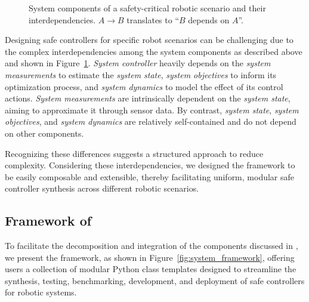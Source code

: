 \begin{figure}[htbp]
    \centering
    \vspace{2cm}  %
    \vspace{2cm}
    \caption{System components of a safety-critical robotic scenario and their interdependencies. $A\rightarrow B$ translates to ``$B$ depends on $A$''.}
    \label{fig: system_components}
\end{figure}

Designing safe controllers for specific robot scenarios can be challenging due to the complex interdependencies among the system components as described above and shown in Figure~\ref{fig: system_components}. 
\textit{System controller} heavily depends on the \textit{system measurements} to estimate the \textit{system state}, \textit{system objectives} to inform its optimization process, and \textit{system dynamics} to model the effect of its control actions.
\textit{System measurements} are intrinsically dependent on the \textit{system state}, aiming to approximate it through sensor data.
By contrast, \textit{system state}, \textit{system objectives}, and \textit{system dynamics} are relatively self-contained and do not depend on other components. 

Recognizing these differences suggests a structured approach to reduce complexity. 
Considering these interdependencies, we designed the \spark framework to be easily composable and extensible, thereby facilitating uniform, modular safe controller synthesis across different robotic scenarios.


\subsection{Framework of \spark}\label{sec: spark_framework} 

To facilitate the decomposition and integration of the components discussed in , we present the \spark framework, as shown in Figure~\ref{fig:system_framework}, offering users a collection of modular Python class templates designed to streamline the synthesis, testing, benchmarking, development, and deployment of safe controllers for robotic systems. 

